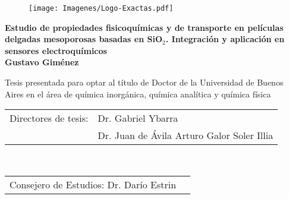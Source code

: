 \begin{titlepage}


		\begin{center}
		\end{center}

		\begin{figure}[ht!]
		\centering
		\texttt{[image: Imagenes/Logo-Exactas.pdf]}%
	 	\end{figure}

	 	\begin{center}
	 	\large{\bfseries{Estudio de propiedades fisicoquímicas y de transporte en películas delgadas mesoporosas basadas en SiO$_2$. Integración y aplicación en sensores electroquímicos}} \\ \vspace*{1.2cm}
	 	\Large{\bfseries{Gustavo Giménez}} \\ \vspace*{1.2cm}
	 	
	 	\normalsize{Tesis presentada para optar al título de Doctor de la Universidad de Buenos Aires en el área de química inorgánica, química analítica y química física} \\ 
	 	\end{center}
		
		\vspace*{1cm}

		\setlength\tabcolsep{1.5pt}
		\noindent\begin{tabular}{@{}ll}
		Directores de tesis:&Dr. Gabriel Ybarra\\  %
		 &Dr. Juan de Ávila Arturo Galor Soler Illia\\						%
		\end{tabular} \\
		\noindent\begin{tabular}{@{}ll}
		Consejero de Estudios: Dr. Darío Estrin \\ %
		\end{tabular} \\ 


\end{titlepage}
